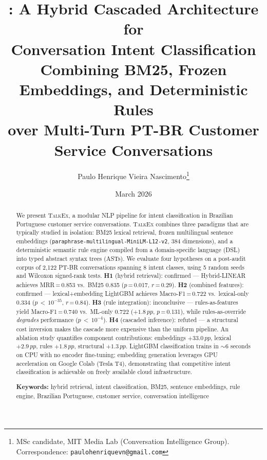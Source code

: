 \documentclass[11pt]{article}
\title{%
\talkex{}: A Hybrid Cascaded Architecture for\\
Conversation Intent Classification\\[6pt]
\large Combining BM25, Frozen Embeddings, and Deterministic Rules\\
over Multi-Turn PT-BR Customer Service Conversations%
}
\author{%
Paulo Henrique Vieira Nascimento\thanks{MSc candidate, MIT Media Lab (Conversation Intelligence Group). Correspondence: \texttt{paulohenriquevn@gmail.com}}
}
\date{March 2026}
\newcommand{\talkex}{\textsc{TalkEx}}
\newcommand{\macrof}{Macro-F1}
\newcommand{\pp}{\,pp}
\begin{document}
\maketitle

\begin{abstract}
We present \talkex{}, a modular NLP pipeline for intent classification in Brazilian Portuguese customer service conversations. \talkex{} combines three paradigms that are typically studied in isolation: BM25 lexical retrieval, frozen multilingual sentence embeddings (\texttt{paraphrase-multilingual-MiniLM-L12-v2}, 384 dimensions), and a deterministic semantic rule engine compiled from a domain-specific language (DSL) into typed abstract syntax trees (ASTs). We evaluate four hypotheses on a post-audit corpus of 2,122 PT-BR conversations spanning 8 intent classes, using 5 random seeds and Wilcoxon signed-rank tests. \textbf{H1} (hybrid retrieval): confirmed --- Hybrid-LINEAR achieves MRR\,=\,0.853 vs.\ BM25 0.835 ($p$\,=\,0.017, $r$\,=\,0.29). \textbf{H2} (combined features): confirmed --- lexical+embedding LightGBM achieves \macrof{}\,=\,0.722 vs.\ lexical-only 0.334 ($p$\,$<$\,$10^{-35}$, $r$\,=\,0.84). \textbf{H3} (rule integration): inconclusive --- rules-as-features yield \macrof{}\,=\,0.740 vs.\ ML-only 0.722 ($+1.8\pp$, $p$\,=\,0.131), while rules-as-override \emph{degrades} performance ($p$\,$<$\,$10^{-4}$). \textbf{H4} (cascaded inference): refuted --- a structural cost inversion makes the cascade more expensive than the uniform pipeline. An ablation study quantifies component contributions: embeddings $+33.0\pp$, lexical $+2.9\pp$, rules $+1.8\pp$, structural $+1.3\pp$. LightGBM classification trains in $\sim$6 seconds on CPU with no encoder fine-tuning; embedding generation leverages GPU acceleration on Google Colab (Tesla T4), demonstrating that competitive intent classification is achievable on freely available cloud infrastructure.

\medskip
\noindent\textbf{Keywords:} hybrid retrieval, intent classification, BM25, sentence embeddings, rule engine, Brazilian Portuguese, customer service, conversation intelligence
\end{abstract}

\end{document}
